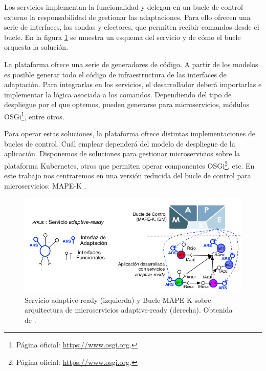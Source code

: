 Los servicios  implementan la funcionalidad y delegan en un bucle de control externo la responsabilidad de gestionar las adaptaciones. Para ello ofrecen una serie de interfaces, las sondas y efectores, que permiten recibir comandos desde el bucle. En la figura \ref{fig:adaptive-ready-services} se muestra un esquema del servicio y de cómo el bucle orquesta la solución.

La plataforma ofrece una serie de generadores de código. A partir de los modelos es posible generar todo el código de infraestructura de las interfaces de adaptación. Para integrarlas en los servicios, el desarrollador deberá importarlas e implementar la lógica asociada a los comandos. Dependiendo del tipo de despliegue por el que optemos, pueden generarse para microservicios, módulos OSGi\footnote{Página oficial: \url{https://www.osgi.org}.}, entre otros.

\pagebreak

Para operar estas soluciones, la plataforma ofrece distintas implementaciones de bucles de control. Cuál emplear dependerá del modelo de despliegue de la aplicación. Disponemos de soluciones para gestionar microservicios sobre la plataforma Kubernetes\cite{fonsServiciosAdaptivereadyPara2021}, otros que permiten operar componentes OSGi\footnote{Página oficial: \url{https://www.osgi.org}.}, etc. En este trabajo nos centraremos en una versión reducida del bucle de control para microservicios: MAPE-K .

\begin{figure}[htb]
  \centering
  \includegraphics[scale=0.4]{cap_sistema_original/images/adaptive-ready-services}
  \caption[Servicio adaptive-ready y Bucle MAPE-K sobre arquitectura de mi-
  croservicios adaptive-ready.]{Servicio adaptive-ready (izquierda) y Bucle MAPE-K sobre arquitectura de microservicios adaptive-ready (derecha). Obtenida de \cite{fonsServiciosAdaptivereadyPara2021}.}
  \label{fig:adaptive-ready-services}
\end{figure}


